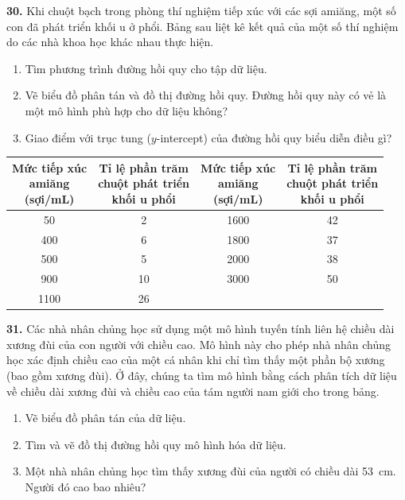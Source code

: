 \documentclass[10pt]{article}
\begin{document}
\begin{minipage}[t]{0.48\textwidth}
\small
\noindent
\techicon\textbf{30.} Khi chuột bạch trong phòng thí nghiệm tiếp xúc với các sợi amiăng, một số con đã phát triển khối u ở phổi. Bảng sau liệt kê kết quả của một số thí nghiệm do các nhà khoa học khác nhau thực hiện.
\begin{enumerate}[label=(\alph*), leftmargin=*, itemsep=2pt, topsep=2pt]
    \item Tìm phương trình đường hồi quy cho tập dữ liệu.
    \item Vẽ biểu đồ phân tán và đồ thị đường hồi quy. Đường hồi quy này có vẻ là một mô hình phù hợp cho dữ liệu không?
    \item Giao điểm với trục tung ($y$-intercept) của đường hồi quy biểu diễn điều gì?
\end{enumerate}

\vspace{0.2cm}
\begin{center}
\renewcommand{\arraystretch}{1.1}
\setlength{\tabcolsep}{3pt}
\begin{tabular}{|c|c|c|c|}
\hline
\rowcolor{stewarttableheader}
\makecell{Mức tiếp xúc\\amiăng\\(sợi/mL)} & \makecell{Tỉ lệ phần trăm\\chuột phát triển\\khối u phổi} & \makecell{Mức tiếp xúc\\amiăng\\(sợi/mL)} & \makecell{Tỉ lệ phần trăm\\chuột phát triển\\khối u phổi} \\
\hline
50   & 2  & 1600 & 42 \\
400  & 6  & 1800 & 37 \\
500  & 5  & 2000 & 38 \\
900  & 10 & 3000 & 50 \\
1100 & 26 &      &    \\
\hline
\end{tabular}
\end{center}

\vspace{0.25cm}
\noindent
\techicon\textbf{31.} Các nhà nhân chủng học sử dụng một mô hình tuyến tính liên hệ chiều dài xương đùi của con người với chiều cao. Mô hình này cho phép nhà nhân chủng học xác định chiều cao của một cá nhân khi chỉ tìm thấy một phần bộ xương (bao gồm xương đùi). Ở đây, chúng ta tìm mô hình bằng cách phân tích dữ liệu về chiều dài xương đùi và chiều cao của tám người nam giới cho trong bảng.
\begin{enumerate}[label=(\alph*), leftmargin=*, itemsep=2pt, topsep=2pt]
    \item Vẽ biểu đồ phân tán của dữ liệu.
    \item Tìm và vẽ đồ thị đường hồi quy mô hình hóa dữ liệu.
    \item Một nhà nhân chủng học tìm thấy xương đùi của người có chiều dài 53~cm. Người đó cao bao nhiêu?
\end{enumerate}


\end{minipage}
\end{document}
